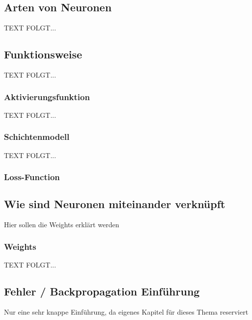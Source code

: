  \subsection{Arten von Neuronen}\label{arten_von_neuronen}
  TEXT FOLGT... 


\newpage
\subsection{Funktionsweise}\label{Funktionsweise}
  TEXT FOLGT... 
 

\newpage
\subsubsection{Aktivierungsfunktion}\label{Aktivierungsfunktion}
  
  TEXT FOLGT... 


\newpage
\subsubsection{Schichtenmodell}\label{Schichtenmodell}
  TEXT FOLGT... 

\subsubsection{Loss-Function}

\newpage 
\subsection{Wie sind Neuronen miteinander verknüpft}\label{kap_verknuepfung_neuronen}  
%
Hier sollen die Weights erklärt werden

\subsubsection{Weights}\label{Weights}
  TEXT FOLGT... 

\subsection{Fehler / Backpropagation Einführung}\label{kap_fehler_backpropagation}
Nur eine sehr knappe Einführung, da eigenes Kapitel für dieses Thema reserviert

